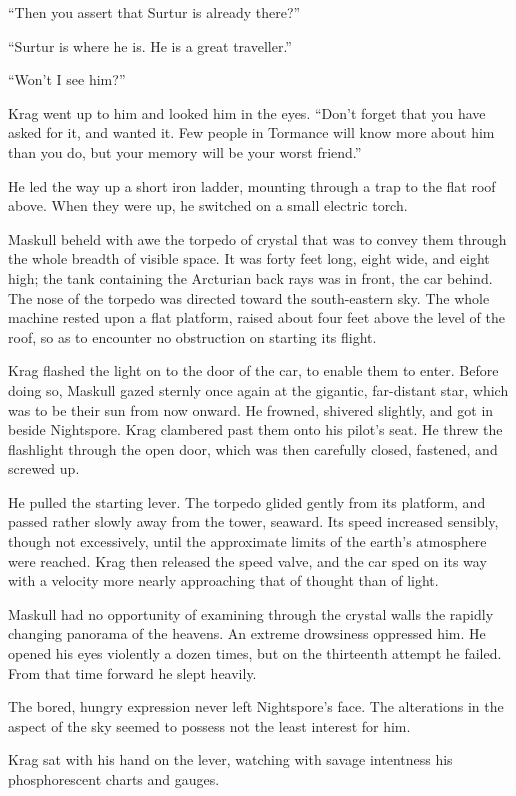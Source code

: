 ``Then you assert that Surtur is already there?''

``Surtur is where he is. He is a great traveller.''

``Won't I see him?''

Krag went up to him and looked him in the eyes. ``Don't forget that you have asked for it, and wanted it. Few people in Tormance will know more about him than you do, but your memory will be your worst friend.''

\introend

He led the way up a short iron ladder, mounting through a trap to the flat roof above. When they were up, he switched on a small electric torch.

Maskull beheld with awe the torpedo of crystal that was to convey them through the whole breadth of visible space. It was forty feet long, eight wide, and eight high; the tank containing the Arcturian back rays was in front, the car behind. The nose of the torpedo was directed toward the south-eastern sky. The whole machine rested upon a flat platform, raised about four feet above the level of the roof, so as to encounter no obstruction on starting its flight.

Krag flashed the light on to the door of the car, to enable them to enter. Before doing so, Maskull gazed sternly once again at the gigantic, far-distant star, which was to be their sun from now onward. He frowned, shivered slightly, and got in beside Nightspore. Krag clambered past them onto his pilot's seat. He threw the flashlight through the open door, which was then carefully closed, fastened, and screwed up.

He pulled the starting lever. The torpedo glided gently from its platform, and passed rather slowly away from the tower, seaward. Its speed increased sensibly, though not excessively, until the approximate limits of the earth's atmosphere were reached. Krag then released the speed valve, and the car sped on its way with a velocity more nearly approaching that of thought than of light.

Maskull had no opportunity of examining through the crystal walls the rapidly changing panorama of the heavens. An extreme drowsiness oppressed him. He opened his eyes violently a dozen times, but on the thirteenth attempt he failed. From that time forward he slept heavily.

The bored, hungry expression never left Nightspore's face. The alterations in the aspect of the sky seemed to possess not the least interest for him.

Krag sat with his hand on the lever, watching with savage intentness his phosphorescent charts and gauges.

\chapterend